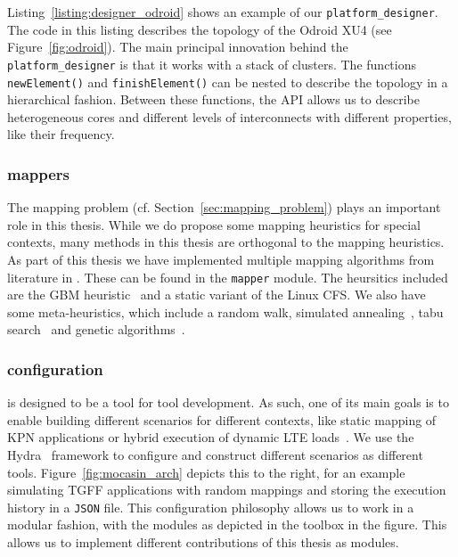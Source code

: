 Listing~\ref{listing:designer_odroid} shows an example of our \texttt{platform\_designer}.
The code in this listing describes the topology of the Odroid XU4 (see Figure~\ref{fig:odroid}). 
The main principal innovation behind the \texttt{platform\_designer} is that it works with a stack of clusters.
The functions \texttt{newElement()} and \texttt{finishElement()} can be nested to describe the topology in a hierarchical fashion.
Between these functions, the \ac{API} allows us to describe heterogeneous cores and different levels of interconnects with different properties, like their frequency.

\subsubsection{mappers}

The mapping problem (cf. Section~\ref{sec:mapping_problem}) plays an important role in this thesis.
While we do propose some mapping heuristics for special contexts, many methods in this thesis are orthogonal to the mapping heuristics.
As part of this thesis we have implemented multiple mapping algorithms from literature in \mocasin.
These can be found in the \texttt{mapper} module. 
The heursitics included are the \ac{GBM} heuristic~\cite{castrillon_dac12} and a static variant of the Linux \ac{CFS}.
We also have some meta-heuristics, which include a random walk, simulated annealing~\cite{simulated_annealing}, tabu search~\cite{tabu_search} and genetic algorithms~\cite{erbas2006multiobjective}. 

\subsubsection{configuration}

\mocasin is designed to be a tool for tool development.
As such, one of its main goals is to enable building different scenarios for different contexts, like static mapping of \ac{KPN} applications or hybrid execution of dynamic \ac{LTE} loads~\cite{menard_rapido21}.
We use the Hydra~\cite{yadan2019hydra} framework to configure \mocasin and construct different scenarios as different tools.
Figure~\ref{fig:mocasin_arch} depicts this to the right, for an example simulating \ac{TGFF} applications with random mappings and storing the execution history in a \texttt{JSON} file.
This configuration philosophy allows us to work in a modular fashion, with the modules as depicted in the \mocasin toolbox in the figure.
This allows us to implement different contributions of this thesis as \mocasin modules.

